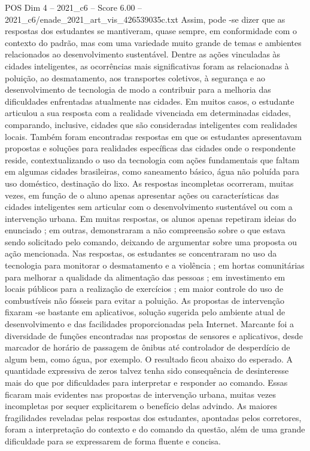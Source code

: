 \begin{textsample}{POS Dim 4 – 2021\_c6 – Score 6.00 – 2021\_c6/enade\_2021\_art\_vis\_426539035c.txt}
Assim, pode -se dizer que as respostas dos estudantes se mantiveram, quase sempre, em conformidade com o contexto do padrão, mas com uma variedade muito grande de temas e ambientes relacionados ao desenvolvimento sustentável.
Dentre as ações vinculadas às cidades inteligentes, as ocorrências mais significativas foram as relacionadas à poluição, ao desmatamento, aos transportes coletivos, à segurança e ao desenvolvimento de tecnologia de modo a contribuir para a melhoria das dificuldades enfrentadas atualmente nas cidades.
Em muitos casos, o estudante articulou a sua resposta com a realidade vivenciada em determinadas cidades, comparando, inclusive, cidades que são consideradas inteligentes com realidades locais.
Também foram encontradas respostas em que os estudantes apresentavam propostas e soluções para realidades específicas das cidades onde o respondente reside, contextualizando o uso da tecnologia com ações fundamentais que faltam em algumas cidades brasileiras, como saneamento básico, água não poluída para uso doméstico, destinação do lixo.
As respostas incompletas ocorreram, muitas vezes, em função de o aluno apenas apresentar ações ou características das cidades inteligentes sem articular com o desenvolvimento sustentável ou com a intervenção urbana.
Em muitas respostas, os alunos apenas repetiram ideias do enunciado ; em outras, demonstraram a não compreensão sobre o que estava sendo solicitado pelo comando, deixando de argumentar sobre uma proposta ou ação mencionada.
Nas respostas, os estudantes se concentraram no uso da tecnologia para monitorar o desmatamento e a violência ; em hortas comunitárias para melhorar a qualidade da alimentação das pessoas ; em investimento em locais públicos para a realização de exercícios ; em maior controle do uso de combustíveis não fósseis para evitar a poluição.
As propostas de intervenção fixaram -se bastante em aplicativos, solução sugerida pelo ambiente atual de desenvolvimento e das facilidades proporcionadas pela Internet.
Marcante foi a diversidade de funções encontradas nas propostas de sensores e aplicativos, desde marcador de horário de passagem de ônibus até controlador de desperdício de algum bem, como água, por exemplo.
O resultado ficou abaixo do esperado.
A quantidade expressiva de zeros talvez tenha sido consequência de desinteresse mais do que por dificuldades para interpretar e responder ao comando.
Essas ficaram mais evidentes nas propostas de intervenção urbana, muitas vezes incompletas por sequer explicitarem o benefício delas advindo.
As maiores fragilidades reveladas pelas respostas dos estudantes, apontadas pelos corretores, foram a interpretação do contexto e do comando da questão, além de uma grande dificuldade para se expressarem de forma fluente e concisa.

\end{textsample}
